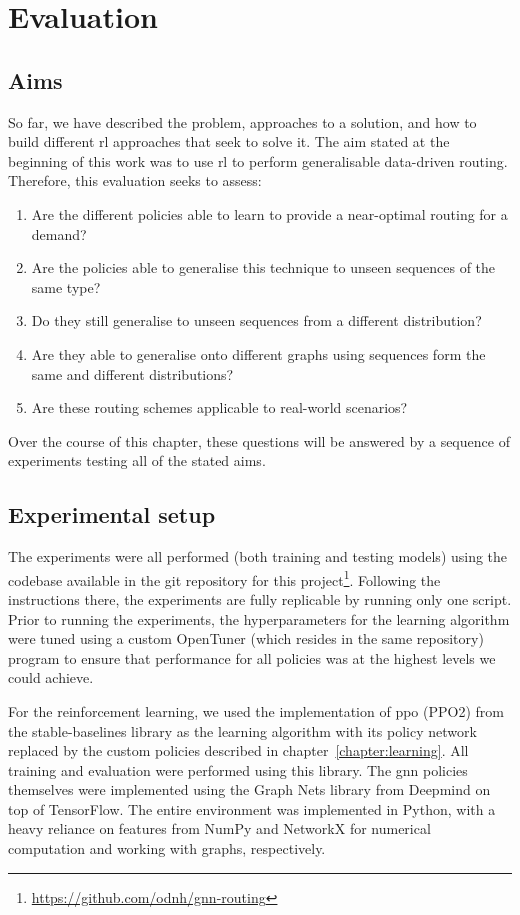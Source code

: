 \chapter{Evaluation}
\label{chapter:evaluation}

\section{Aims}
So far, we have described the problem, approaches to a solution, and how to build different \ac{rl} approaches that seek to solve it. The aim stated at the beginning of this work was to use \ac{rl} to perform generalisable data-driven routing. Therefore, this evaluation seeks to assess:

\begin{enumerate}
\item Are the different policies able to learn to provide a near-optimal routing for a demand?
\item Are the policies able to generalise this technique to unseen sequences of the same type?
\item Do they still generalise to unseen sequences from a different distribution?
\item Are they able to generalise onto different graphs using sequences form the same and different distributions?
\item Are these routing schemes applicable to real-world scenarios?
\end{enumerate}

Over the course of this chapter, these questions will be answered by a sequence of experiments testing all of the stated aims.


\section{Experimental setup}
The experiments were all performed (both training and testing models) using the codebase available in the git repository for this project\footnote{\url{https://github.com/odnh/gnn-routing}}. Following the instructions there, the experiments are fully replicable by running only one script. Prior to running the experiments, the hyperparameters for the learning algorithm were tuned using a custom OpenTuner\cite{ansel2014opentuner} (which resides in the same repository) program to ensure that performance for all policies was at the highest levels we could achieve.

For the reinforcement learning, we used the implementation of \ac{ppo} (PPO2) from the stable-baselines\cite{stable-baselines} library as the learning algorithm with its policy network replaced by the custom policies described in chapter~\ref{chapter:learning}. All training and evaluation were performed using this library. The \ac{gnn} policies themselves were implemented using the Graph Nets\cite{battaglia2018relational} library from Deepmind on top of TensorFlow\cite{tensorflow2015-whitepaper}. The entire environment was implemented in Python\cite{10.5555/1593511}, with a heavy reliance on features from NumPy\cite{oliphant2006guide} and NetworkX\cite{hagberg2008exploring} for numerical computation and working with graphs, respectively.

